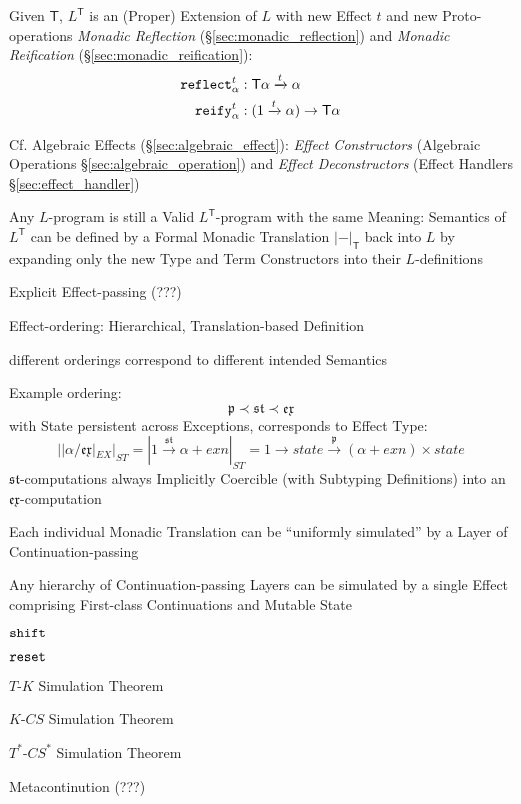 Given $\mathsf{T}$, $L^\mathsf{T}$ is an (Proper) Extension of $L$
with new Effect $t$ and new Proto-operations \emph{Monadic Reflection}
(\S\ref{sec:monadic_reflection}) and \emph{Monadic Reification}
(\S\ref{sec:monadic_reification}):
\begin{align*}
  \mathtt{reflect}_\alpha^t &: \mathsf{T} \alpha \xrightarrow{t} \alpha \\
  \mathtt{reify}_\alpha^t &: (1 \xrightarrow{t} \alpha) \rightarrow
    \mathsf{T} \alpha
\end{align*}

\fist Cf. Algebraic Effects (\S\ref{sec:algebraic_effect}):
\emph{Effect Constructors} (Algebraic Operations
\S\ref{sec:algebraic_operation}) and \emph{Effect Deconstructors}
(Effect Handlers \S\ref{sec:effect_handler})

Any $L$-program is still a Valid $L^\mathsf{T}$-program with the same
Meaning: Semantics of $L^\mathsf{T}$ can be defined by a Formal
Monadic Translation $|-|_\mathsf{T}$ back into $L$ by expanding only
the new Type and Term Constructors into their $L$-definitions

Explicit Effect-passing (???)

Effect-ordering: Hierarchical, Translation-based Definition

different orderings correspond to different intended Semantics

Example ordering:
\[
\mathfrak{p} \prec \mathfrak{st} \prec \mathfrak{ex}
\]
with State persistent across Exceptions, corresponds to Effect Type:
\[
  ||\alpha / \mathfrak{ex}|_{EX}|_{ST} = |1
  \xrightarrow{\mathfrak{st}} \alpha + exn|_{ST} = 1 \rightarrow state
  \xrightarrow{\mathfrak{p}} (\alpha + exn) \times state
\]
$\mathfrak{st}$-computations always Implicitly Coercible (with
Subtyping Definitions) into an
$\mathfrak{ex}$-computation

Each individual Monadic Translation can be ``uniformly simulated'' by
a Layer of Continuation-passing

Any hierarchy of Continuation-passing Layers can be simulated by a
single Effect comprising First-class Continuations and Mutable State

$\mathtt{shift}$

$\mathtt{reset}$

$T$-$K$ Simulation Theorem

$K$-$CS$ Simulation Theorem

$T^*$-$CS^*$ Simulation Theorem

Metacontinution (???)

